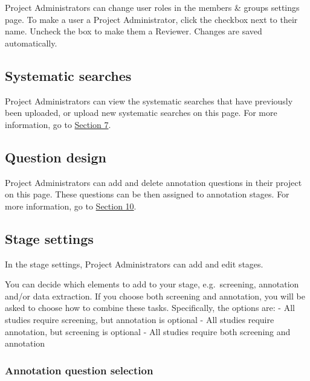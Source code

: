 \documentclass[
]{book}
\begin{document}
Project Administrators can change user roles in the members \& groups settings page. To make a user a Project Administrator, click the checkbox next to their name. Uncheck the box to make them a Reviewer. Changes are saved automatically.

\hypertarget{systematic-searches}{%
\subsection{Systematic searches}\label{systematic-searches}}

Project Administrators can view the systematic searches that have previously been uploaded, or upload new systematic searches on this page. For more information, go to \href{https://camaradesuk.github.io/syrf_userguide/systematicSearch.html}{Section 7}.

\hypertarget{question-design}{%
\subsection{Question design}\label{question-design}}

Project Administrators can add and delete annotation questions in their project on this page. These questions can be then assigned to annotation stages. For more information, go to \href{https://camaradesuk.github.io/syrf_userguide/projectannotation.html}{Section 10}.

\hypertarget{stage-settings}{%
\subsection{Stage settings}\label{stage-settings}}

In the stage settings, Project Administrators can add and edit stages.

You can decide which elements to add to your stage, e.g.~screening, annotation and/or data extraction. If you choose both screening and annotation, you will be asked to choose how to combine these tasks. Specifically, the options are:
- All studies require screening, but annotation is optional
- All studies require annotation, but screening is optional
- All studies require both screening and annotation

\hypertarget{annotation-question-selection}{%
\subsubsection{Annotation question selection}\label{annotation-question-selection}}
\end{document}
